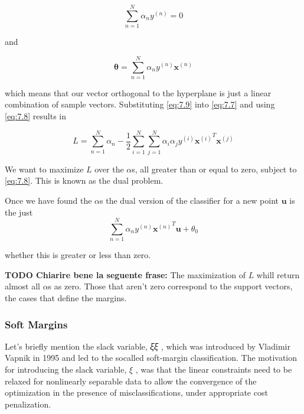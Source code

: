 \documentclass[11pt]{article}
\begin{document}
\begin{equation}\label{eq:7.8}
\sum\limits_{n=1}^N \alpha_n  y^{(n)} = 0
\end{equation}

and

\begin{equation}\label{eq:7.9}
\mathbf{\theta} = \sum\limits_{n=1}^N \alpha_n  y^{(n)} \mathbf{x}^{(n)} 
\end{equation}

which means that our vector orthogonal to the hyperplane is just a
linear combination of sample vectors. Substituting \eqref{eq:7.9} into
\eqref{eq:7.7} and using \eqref{eq:7.8} results in

\begin{equation}
L = \sum\limits_{n=1}^N \alpha_n - \frac{1}{2} \sum\limits_{i=1}^N \sum\limits_{j=1}^N \alpha_i \alpha_j y^{(i)} 
{\mathbf{x}^{(i)}}^T \mathbf{x}^{(j)} 
\end{equation}

We want to maximize \(L\) over the \(\alpha\)s, all greater than or
equal to zero, subject to \eqref{eq:7.8}. This is known as the dual
problem.

Once we have found the \(\alpha\)s the dual version of the classifier
for a new point \(\mathbf{u}\) is the just \begin{equation}
\sum\limits_{n=1}^N \alpha_n   y^{(n)} {\mathbf{x}^{(n)}}^T  \mathbf{u} + \theta_0
\end{equation}

whether this is greater or less than zero.

\textbf{TODO Chiarire bene la seguente frase:} The maximization of \(L\)
whill return almost all \(\alpha\)s as zero. Those that aren't zero
correspond to the support vectors, the cases that define the margins.

    \hypertarget{soft-margins}{%
\subsubsection{Soft Margins}\label{soft-margins}}

    Let's briefly mention the slack variable, 𝜉𝜉 , which was introduced by
Vladimir Vapnik in 1995 and led to the socalled soft-margin
classification. The motivation for introducing the slack variable,
\(\xi\) , was that the linear constraints need to be relaxed for
nonlinearly separable data to allow the convergence of the optimization
in the presence of misclassifications, under appropriate cost
penalization.
\end{document}
